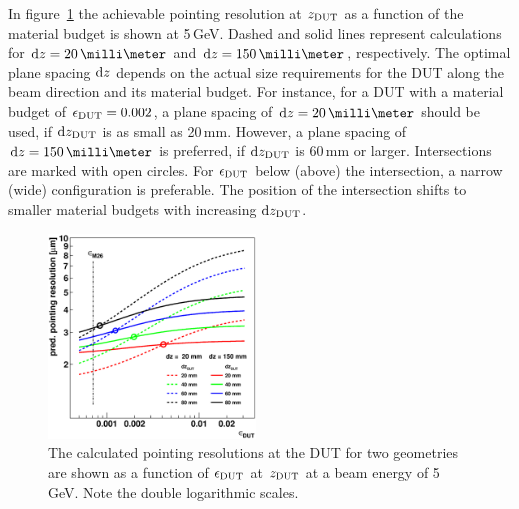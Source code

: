 In figure~\ref{fig:CalcResoP_DUT} the achievable pointing resolution at $z_{\textrm{DUT}}$ as a function of the material budget is shown at 5\,GeV.
Dashed and solid lines represent calculations for $\dz = 20\,\milli\meter$ and $\dz = 150\,\milli\meter$, respectively. 
The optimal plane spacing $\textrm{d}z$ depends on the actual size requirements for the DUT along the beam direction and its material budget.
For instance, for a DUT with a material budget of $\mathnormal{\epsilon_{\textrm{DUT}}} = 0.002$, a plane spacing of $\dz = 20\,\milli\meter$ should be used, if $\textrm{d}z_{\textrm{DUT}}$ is as small as 20\,mm. 
However, a plane spacing of $\dz = 150\,\milli\meter$ is preferred, if $\textrm{d}z_{\textrm{DUT}}$ is 60\,mm or larger. 
Intersections are marked with open circles. 
For $\mathnormal{\epsilon_{\textrm{DUT}}}$ below (above) the intersection, a narrow (wide) configuration is preferable. 
The position of the intersection shifts to smaller material budgets with increasing $\textrm{d}z_{\textrm{DUT}}$. 

\begin{figure}[tbp]
  \centering
  \includegraphics[width=0.49\textwidth]{figures/CalcResoVsEpsdut} %
   \caption[Pointing resolution as a function of the beam energy]{
   The calculated pointing resolutions at the DUT for two geometries are shown as a function of $\mathnormal{\epsilon_{\textrm{DUT}}}$ at $z_{\textrm{DUT}}$ at a beam energy of 5\,GeV. 
   Note the double logarithmic scales. 
   }
 \label{fig:CalcResoP_DUT}
\end{figure}


